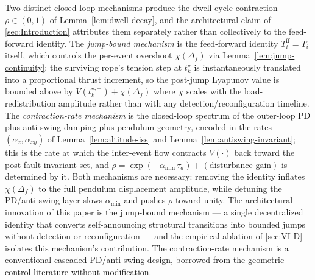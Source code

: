 \begin{remark}
\label{rem:jump-vs-rate}
Two distinct closed-loop mechanisms produce the dwell-cycle contraction $\rho \in (0, 1)$ of Lemma~\ref{lem:dwell-decay}, and the architectural claim of \cref{sec:Introduction} attributes them separately rather than collectively to the feed-forward identity. The \emph{jump-bound mechanism} is the feed-forward identity $T_i^{\mathrm{ff}} = T_i$ itself, which controls the per-event overshoot $\chi(\Delta_f)$ via Lemma~\ref{lem:jump-continuity}: the surviving rope's tension step at $t_k^\star$ is instantaneously translated into a proportional thrust increment, so the post-jump Lyapunov value is bounded above by $V(t_k^{\star,-}) + \chi(\Delta_f)$ where $\chi$ scales with the load-redistribution amplitude rather than with any detection/reconfiguration timeline. The \emph{contraction-rate mechanism} is the closed-loop spectrum of the outer-loop PD plus anti-swing damping plus pendulum geometry, encoded in the rates $(\alpha_z, \alpha_{xy})$ of Lemma~\ref{lem:altitude-iss} and Lemma~\ref{lem:antiswing-invariant}; this is the rate at which the inter-event flow contracts $V(\cdot)$ back toward the post-fault invariant set, and $\rho = \exp(-\alpha_{\min}\,\tau_d) + (\text{disturbance gain})$ is determined by it. Both mechanisms are necessary: removing the identity inflates $\chi(\Delta_f)$ to the full pendulum displacement amplitude, while detuning the PD/anti-swing layer slows $\alpha_{\min}$ and pushes $\rho$ toward unity. The architectural innovation of this paper is the jump-bound mechanism --- a single decentralized identity that converts self-announcing structural transitions into bounded jumps without detection or reconfiguration --- and the empirical ablation of \cref{sec:VI-D} isolates this mechanism's contribution. The contraction-rate mechanism is a conventional cascaded PD/anti-swing design, borrowed from the geometric-control literature without modification.
\end{remark}

